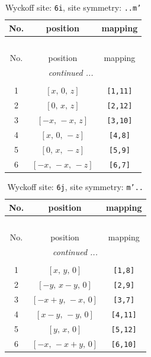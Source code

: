 \documentclass[fleqn,8pt]{jsarticle}
\begin{document}
\renewcommand{\arraystretch}{1.2}
\begin{longtable}{ccc}
\caption{Wyckoff site: {\tt 6i}, site symmetry: {\tt ..m'}}
 \\
 \hline \hline
No. & position & mapping \\ \hline \endfirsthead

\multicolumn{2}{l}{\tablename\ \thetable{}} \\
 \hline \hline
No. & position & mapping \\ \hline \endhead

 \hline \hline
\multicolumn{2}{r}{\footnotesize\it continued ...} \\ \endfoot

 \hline \hline
\multicolumn{2}{r}{} \\ \endlastfoot

1 & $\left[ x,\, 0,\, z \right]$ & {\tt [1,11]} \\ \hline
2 & $\left[ 0,\, x,\, z \right]$ & {\tt [2,12]} \\ \hline
3 & $\left[ - x,\, - x,\, z \right]$ & {\tt [3,10]} \\ \hline
4 & $\left[ x,\, 0,\, - z \right]$ & {\tt [4,8]} \\ \hline
5 & $\left[ 0,\, x,\, - z \right]$ & {\tt [5,9]} \\ \hline
6 & $\left[ - x,\, - x,\, - z \right]$ & {\tt [6,7]} \\
\end{longtable}
\renewcommand{\arraystretch}{1.2}
\begin{longtable}{ccc}
\caption{Wyckoff site: {\tt 6j}, site symmetry: {\tt m'..}}
 \\
 \hline \hline
No. & position & mapping \\ \hline \endfirsthead

\multicolumn{2}{l}{\tablename\ \thetable{}} \\
 \hline \hline
No. & position & mapping \\ \hline \endhead

 \hline \hline
\multicolumn{2}{r}{\footnotesize\it continued ...} \\ \endfoot

 \hline \hline
\multicolumn{2}{r}{} \\ \endlastfoot

1 & $\left[ x,\, y,\, 0 \right]$ & {\tt [1,8]} \\ \hline
2 & $\left[ - y,\, x - y,\, 0 \right]$ & {\tt [2,9]} \\ \hline
3 & $\left[ - x + y,\, - x,\, 0 \right]$ & {\tt [3,7]} \\ \hline
4 & $\left[ x - y,\, - y,\, 0 \right]$ & {\tt [4,11]} \\ \hline
5 & $\left[ y,\, x,\, 0 \right]$ & {\tt [5,12]} \\ \hline
6 & $\left[ - x,\, - x + y,\, 0 \right]$ & {\tt [6,10]} \\
\end{longtable}
\end{document}
